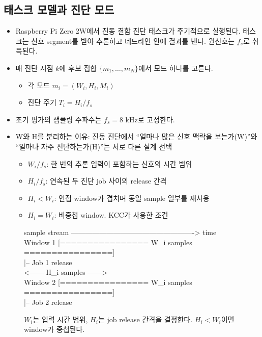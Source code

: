 \documentclass[10pt]{article}
\begin{document}
\subsection{태스크 모델과 진단 모드}
\begin{itemize}
\item Raspberry Pi Zero 2W에서 진동 결함 진단 태스크가 주기적으로 실행된다. 태스크는 신호 segment를 받아 추론하고 데드라인 안에 결과를 낸다. 원신호는 $f_s$로 취득된다.
\item 매 진단 시점 $k$에 후보 집합 $\{m_1, \dots, m_N\}$에서 모드 하나를 고른다.
\begin{itemize}
\item 각 모드 $m_i = (W_i, H_i, M_i)$
\item 진단 주기 $T_i = H_i / f_s$
\end{itemize}
\item 초기 평가의 샘플링 주파수는 $f_s=8$ kHz로 고정한다.
\item W와 H를 분리하는 이유: 진동 진단에서 ``얼마나 많은 신호 맥락을 보는가(W)''와 ``얼마나 자주 진단하는가(H)''는 서로 다른 설계 선택
\begin{itemize}
\item $W_i/f_s$: 한 번의 추론 입력이 포함하는 신호의 시간 범위
\item $H_i/f_s$: 연속된 두 진단 job 사이의 release 간격
\item $H_i<W_i$: 인접 window가 겹치며 동일 sample 일부를 재사용
\item $H_i=W_i$: 비중첩 window. KCC가 사용한 조건
\end{itemize}
\end{itemize}
\begin{figure}[ht]
\centering
\begin{minipage}{0.94\linewidth}\small\ttfamily
sample stream ----------------------------------------------------> time\\[2pt]
Window 1 [================ W\_i samples ================]\\
\hspace*{8.5cm}|-- Job 1 release\\
\hspace*{2.3cm}<------ H\_i samples ------>\\
Window 2 \hspace*{1.7cm}[================ W\_i samples ================]\\
\hspace*{11.1cm}|-- Job 2 release
\end{minipage}
\caption{$W_i$는 입력 시간 범위, $H_i$는 job release 간격을 결정한다. $H_i<W_i$이면 window가 중첩된다.}
\end{figure}
\end{document}
